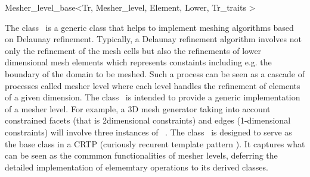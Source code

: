 

\begin{ccRefClass}{Mesher_level_base<Tr, Mesher_level, Element, Lower,
Tr_traits >}  %


\ccDefinition
  
The class \ccRefName\ is a generic class 
that helps to implement meshing algorithms 
based on Delaunay refinement.
Typically, a  Delaunay refinement algorithm
involves not only  the refinement of the mesh cells
but also the refinements of lower dimensional mesh elements
which represents  constaints including e.g.
the boundary of the domain to be meshed. 
Such a process can be seen
as a cascade of processes called mesher level  where each  level
handles the refinement of elements of a given dimension.
The class  \ccRefName\ is intended to provide a generic implementation
of a mesher level.
For example, a 3D mesh generator taking into account
constrained facets (that is 2dimensional constraints)
and edges (1-dimensional constraints) will involve
three  instances of \ccRefName\ .
The class \ccRefName\ 
is designed to serve as the base class
in a CRTP (curiously recurent template pattern ).
It captures what can be seen as the commmon functionalities
of mesher levels, deferring the  detailed implementation
of elememtary operations to its derived classes.




\end{ccRefClass}
